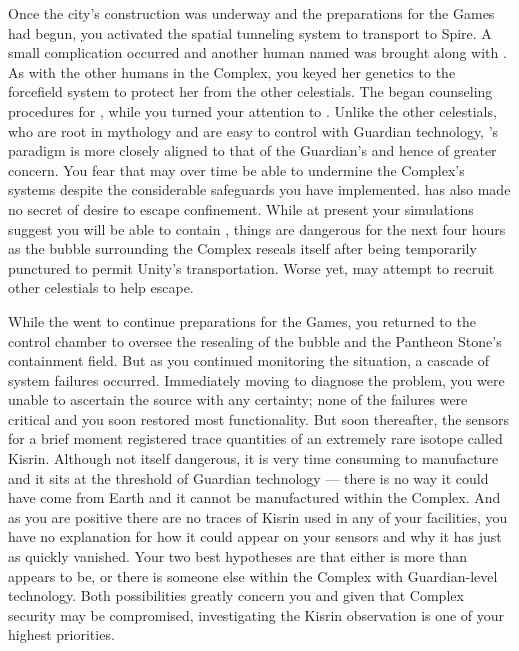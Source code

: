 \documentclass[char]{guardians}
\begin{document}
Once the city's construction was underway and the preparations for the Games had begun, you activated the spatial tunneling system to transport \cUnity{} to Spire. A small complication occurred and another human named \cKachiko{\intro} was brought along with \cUnity{}. As with the other humans in the Complex, you keyed her genetics to the forcefield system to protect her from the other celestials. The \cCaretaker{} began counseling procedures for \cKachiko{}, while you turned your attention to \cUnity{}. Unlike the other celestials, who are root in mythology and are easy to control with Guardian technology, \cUnity{}'s paradigm is more closely aligned to that of the Guardian's and hence of greater concern. You fear that \cUnity{} may over time be able to undermine the Complex's systems despite the considerable safeguards you have implemented. \cUnity{} has also made no secret of \cUnity{\their} desire to escape confinement. While at present your simulations suggest you will be able to contain \cUnity{}, things are dangerous for the next four hours as the bubble surrounding the Complex reseals itself after being temporarily punctured to permit Unity's transportation. Worse yet, \cUnity{} may attempt to recruit other celestials to help \cUnity{\them} escape.

While the \cCaretaker{} went to continue preparations for the Games, you returned to the control chamber to oversee the resealing of the bubble and the Pantheon Stone's containment field. But as you continued monitoring the situation, a cascade of system failures occurred. Immediately moving to diagnose the problem, you were unable to ascertain the source with any certainty; none of the failures were critical and you soon restored most functionality. But soon thereafter, the sensors for a brief moment registered trace quantities of an extremely rare isotope called Kisrin. Although not itself dangerous, it is very time consuming to manufacture and it sits at the threshold of Guardian technology --- there is no way it could have come from Earth and it cannot be manufactured within the Complex. And as you are positive there are no traces of Kisrin used in any of your facilities, you have no explanation for how it could appear on your sensors and why it has just as quickly vanished. Your two best hypotheses are that either \cUnity{} is more than \cUnity{\they} appears to be, or there is someone else within the Complex with Guardian-level technology. Both possibilities greatly concern you and given that Complex security may be compromised, investigating the Kisrin observation is one of your highest priorities.
\end{document}
